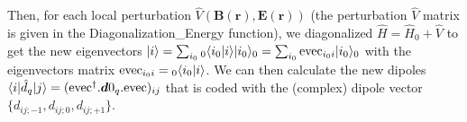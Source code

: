 \documentclass[amsmath,amssymb,nofootinbib]{revtex4-2}
\begin{document}
	 		 
	 		 Then, for each local perturbation $\hat V(\bm B(\bm r), \bm E(\bm r) )$ 
	 		 (the perturbation $\hat V$ matrix is given in the  Diagonalization\_Energy function),	 		 
	 		 we diagonalized $ \hat H = \hat H_0+\hat V$ to get the new eigenvectors
	 		  $| i\rangle = \sum_{i_0} {}_0\langle i_0 |   i\rangle |i_0\rangle_0   =  \sum_{i_0} {\rm \bm evec}_{i_0 i } |i_0\rangle_0  $ with the eigenvectors matrix  ${\rm \bm evec}_{i_0 i } =
	 		  {}_0\langle i_0 |   i\rangle$. We can then calculate the new dipoles 
	 		$ \langle i | \hat d_q | j \rangle =  ({\rm \bm evec}^\dag.{\bm d0}_q.{\rm \bm evec})_{ij} $ that is coded with the (complex) dipole vector $ \{ d_{ij;-1},d_{ij;0},d_{ij;+1} \} $.
	
	 


\end{document}
